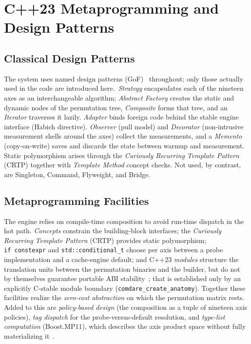 \section{C++23 Metaprogramming and Design Patterns}\label{sec:cpp23}
\subsection{Classical Design Patterns}\label{ssec:classic-patterns}
The system uses named design patterns (GoF)~\cite{gamma1994patterns} throughout; only those actually
used in the code are introduced here.\ \emph{Strategy} encapsulates each of the nineteen axes as an
interchangeable algorithm; \emph{Abstract Factory} creates the static and dynamic nodes of the
permutation tree, \emph{Composite} forms that tree, and an \emph{Iterator} traverses it lazily.
\emph{Adapter} binds foreign code behind the stable engine interface (Habich directive).
\emph{Observer} (pull model) and \emph{Decorator} (non-intrusive measurement shells around the axes)
collect the measurements, and a \emph{Memento} (copy-on-write) saves and discards the state between
warmup and measurement. Static polymorphism arises through the
\emph{Curiously Recurring Template Pattern} (CRTP) together with \emph{Template Method} concept
checks. Not used, by contrast, are Singleton, Command, Flyweight, and Bridge.

\subsection{Metaprogramming Facilities}\label{ssec:metaprog-facilities}
The engine relies on compile-time composition to avoid run-time dispatch in the hot path.
\emph{Concepts} constrain the building-block interfaces; the
\emph{Curiously Recurring Template Pattern} (CRTP) provides static polymorphism;
\texttt{if~constexpr} and \texttt{std::conditional\_t} choose per axis between a probe
implementation and a cache-engine default; and C++23 \emph{modules} structure the translation units
between the permutation binaries and the builder, but do not by themselves guarantee portable ABI
stability~\cite{wg21_modules_abi}; that is established only by an explicitly C-stable module
boundary (\texttt{comdare\_create\_anatomy}). Together these facilities realize the
\emph{zero-cost abstraction} on which the permutation matrix rests. Added to this are
\emph{policy-based design} (the composition as a tuple of nineteen axis policies),
\emph{tag dispatch} for the probe-versus-default resolution, and \emph{type-list computation}
(Boost.MP11), which describes the axis product space without fully materializing
it~\cite{alexandrescu2001modern}.

